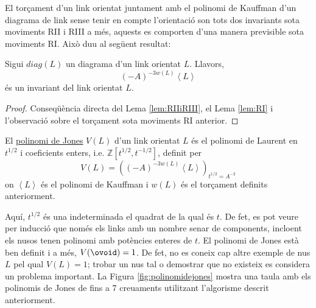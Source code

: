 El torçament d'un link orientat juntament amb el polinomi de Kauffman d'un diagrama de link sense tenir en compte l'orientació son tots dos invariants sota moviments RII i RIII a més, aquests es comporten d'una manera previsible sota moviments RI. Això duu al següent resultat:

\begin{theorem}
	Sigui $diag(L)$ un diagrama d'un link orientat $L$. Llavors, $$(-A)^{-3w(L)}\left\langle L\right\rangle$$ és un invariant del link orientat $L$.
\end{theorem}

\begin{proof}
	Conseqüència directa del Lema \ref{lem:RIIiRIII}, el Lema \ref{lem:RI} i l'observació sobre el torçament sota moviments RI anterior.
\end{proof}

\begin{definition}\label{def:polinomidejones}
	El \underline{polinomi de Jones} $V(L)$ d'un link orientat $L$ és el polinomi de Laurent en $t^{1/2}$ i coeficients enters, i.e. $\mathbb{Z}[t^{1/2},t^{-1/2}]$, definit per $$V(L)=\left((-A)^{-3w(L)}\left\langle L\right\rangle\right)_{t^{1/2}=A^{-2}}$$ on $\left\langle L\right\rangle$ és el polinomi de Kauffman i $w(L)$ és el torçament definits anteriorment.
\end{definition}

Aquí, $t^{1/2}$ és una indeterminada el quadrat de la qual és $t$. De fet, es pot veure per inducció que només els links amb un nombre senar de components, incloent els nusos tenen polinomi amb potències enteres de $t$. El polinomi de Jones està ben definit i a més, $V(\ovoid)=1$. De fet, no es coneix cap altre exemple de nus $L$ pel qual $V(L)=1$; trobar un nus tal o demostrar que no existeix es considera un problema important. La Figura \ref{fig:polinomidejones} mostra una taula amb els polinomis de Jones de fins a 7 creuaments utilitzant l'algorisme descrit anteriorment.\\

